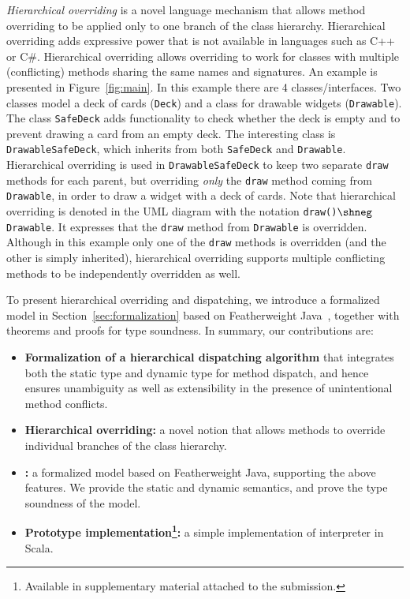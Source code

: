 \textit{Hierarchical overriding} is a novel language
mechanism that allows method overriding to be applied
only to one branch of the class hierarchy. Hierarchical overriding 
adds expressive power that is not available in languages such as 
C++ or C\#. Hierarchical overriding allows overriding to work 
for classes with multiple (conflicting) methods sharing the 
same names and signatures. An example is presented in 
Figure~\ref{fig:main}. In this example there are 4 classes/interfaces.
Two classes model a deck of cards (\lstinline|Deck|) and a class for
drawable widgets (\lstinline|Drawable|). 
The class \lstinline|SafeDeck| adds functionality to check whether the
deck is empty and to prevent drawing a card from an empty deck. 
The interesting class is \lstinline|DrawableSafeDeck|, which inherits 
from both \lstinline|SafeDeck| and \lstinline|Drawable|. Hierarchical
overriding is used in \lstinline|DrawableSafeDeck| to keep two separate \lstinline|draw|
methods for each parent, but overriding \emph{only} the \lstinline|draw|
method coming from \lstinline|Drawable|, in order to draw a widget
with a deck of cards. Note that hierarchical overriding is denoted in the UML
diagram with the notation
\lstinline|draw()|$\shneg$\lstinline|Drawable|. It expresses that the \lstinline|draw| method from \lstinline|Drawable|
is overridden. Although in this example only one of the
\lstinline|draw| methods is overridden (and the other is simply inherited), hierarchical overriding
supports multiple conflicting methods to be independently overridden as well.


To present hierarchical overriding and dispatching, we introduce a
formalized model \MIM{} in Section~\ref{sec:formalization} based on
Featherweight Java~\cite{Igarashi01FJ}, together with theorems and
proofs for type soundness. 
In summary, our contributions are:
\begin{itemize}
	\item \textbf{Formalization of a hierarchical dispatching algorithm} that integrates both the static type and dynamic type for method dispatch, and hence
	ensures unambiguity as well as extensibility in the presence
        of unintentional method conflicts.
	\item \textbf{Hierarchical overriding:} a novel notion that allows
          methods to override individual branches of the class hierarchy.
	\item \textbf{\name:} a formalized model based on
          Featherweight Java, supporting the above features. 
          We provide the static and dynamic semantics, and prove the
          type soundness of the model.
	\item \textbf{Prototype implementation\footnote{Available in
              supplementary material attached to the submission.}:} a
          simple implementation of \MIM{} interpreter in Scala.
\end{itemize}

 